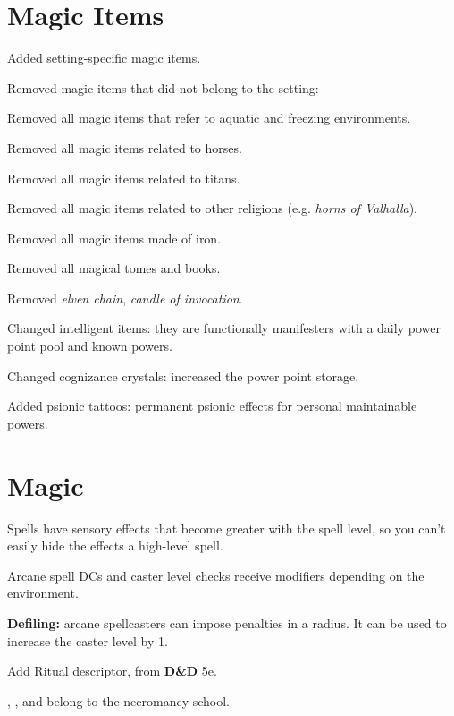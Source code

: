\section{Magic Items}
\begin{itemize*}
\item Added setting-specific magic items.
\item Removed magic items that did not belong to the setting:
	\begin{itemize*}
	\item Removed all magic items that refer to aquatic and freezing environments.
	\item Removed all magic items related to horses.
	\item Removed all magic items related to titans.
	\item Removed all magic items related to other religions (e.g. \emph{horns of Valhalla}).
	\item Removed all magic items made of iron.
	\item Removed all magical tomes and books.
	\item Removed \emph{elven chain}, \emph{candle of invocation}.
	\end{itemize*}
\item Changed intelligent items: they are functionally manifesters with a daily power point pool and known powers.
\item Changed cognizance crystals: increased the power point storage.
\item Added psionic tattoos: permanent psionic effects for personal maintainable powers.
\end{itemize*}


\section{Magic}
\begin{itemize*}
\item Spells have sensory effects that become greater with the spell level, so you can't easily hide the effects a high-level spell.
\item Arcane spell DCs and caster level checks receive modifiers depending on the environment.
\item \textbf{Defiling:} arcane spellcasters can impose penalties in a radius. It can be used to increase the caster level by 1.
\item Add Ritual descriptor, from \textbf{D\&D} 5e.
\item {}, , and  belong to the necromancy school.
\end{itemize*}


